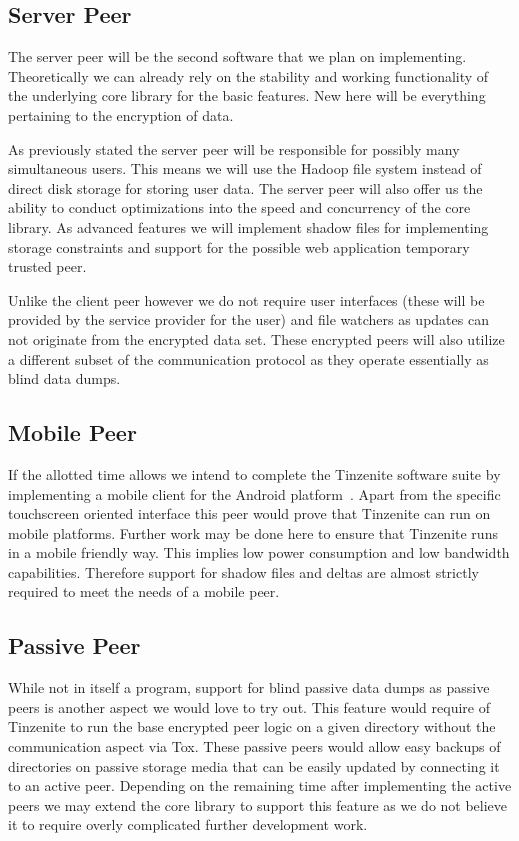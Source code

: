 \subsection{Server Peer}

The server peer will be the second software that we plan on implementing.
Theoretically we can already rely on the stability and working functionality of the underlying core library for the basic features.
New here will be everything pertaining to the encryption of data.

As previously stated the server peer will be responsible for possibly many simultaneous users.
This means we will use the Hadoop file system instead of direct disk storage for storing user data.
The server peer will also offer us the ability to conduct optimizations into the speed and concurrency of the core library.
As advanced features we will implement shadow files for implementing storage constraints and support for the possible web application temporary trusted peer.

Unlike the client peer however we do not require user interfaces (these will be provided by the service provider for the user) and file watchers as updates can not originate from the encrypted data set.
These encrypted peers will also utilize a different subset of the communication protocol as they operate essentially as blind data dumps.

\subsection{Mobile Peer}

If the allotted time allows we intend to complete the Tinzenite software suite by implementing a mobile client for the Android platform~\cite{web:site:android}.
Apart from the specific touchscreen oriented interface this peer would prove that Tinzenite can run on mobile platforms.
Further work may be done here to ensure that Tinzenite runs in a mobile friendly way.
This implies low power consumption and low bandwidth capabilities.
Therefore support for shadow files and deltas are almost strictly required to meet the needs of a mobile peer.

\subsection{Passive Peer}

While not in itself a program, support for blind passive data dumps as passive peers is another aspect we would love to try out.
This feature would require of Tinzenite to run the base encrypted peer logic on a given directory without the communication aspect via Tox.
These passive peers would allow easy backups of directories on passive storage media that can be easily updated by connecting it to an active peer.
Depending on the remaining time after implementing the active peers we may extend the core library to support this feature as we do not believe it to require overly complicated further development work.
